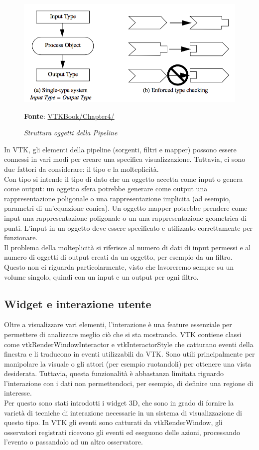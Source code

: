 \begin{figure}[h]
    \centering
    \includegraphics[scale=0.35]{immagini/volumerendering/pipeline.png}
    \caption{\textit{Struttura oggetti della Pipeline}}
    \textbf{Fonte}: \href{https://lorensen.github.io/VTKExamples/site/VTKBook/04Chapter4/}{VTKBook/Chapter4/}
    \label{fig: Struttura Pipeline}
\end{figure}

In VTK, gli elementi della pipeline (sorgenti, filtri e mapper) possono essere connessi in vari modi per creare una specifica visualizzazione. Tuttavia, ci sono due fattori da considerare: il tipo e la molteplicità.\\
Con tipo si intende il tipo di dato che un oggetto accetta come input o genera come output: un oggetto sfera potrebbe generare come output una rappresentazione poligonale o una rappresentazione implicita (ad esempio, parametri di un'equazione conica). Un oggetto mapper potrebbe prendere come input una rappresentazione poligonale o un una rappresentazione geometrica di punti. L'input in un oggetto deve essere specificato e utilizzato correttamente per funzionare.
\\
Il problema della molteplicità si riferisce al numero di dati di input permessi e al numero di oggetti di output creati da un oggetto, per esempio da un filtro. Questo non ci riguarda particolarmente, visto che lavoreremo sempre su un volume singolo, quindi con un input e un output per ogni filtro.

\subsection{Widget e interazione utente}\label{sec:widget-interazione}
Oltre a visualizzare vari elementi, l'interazione è una feature essenziale per permettere di analizzare meglio ciò che si sta mostrando. VTK contiene classi come vtkRenderWindowInteractor e vtkInteractorStyle che catturano eventi della finestra e li traducono in eventi utilizzabili da VTK. Sono utili principalmente per manipolare la visuale o gli attori (per esempio ruotandoli) per ottenere una vista desiderata. Tuttavia, questa funzionalità è abbastanza limitata riguardo l'interazione con i dati non permettendoci, per esempio, di definire una regione di interesse.\\
Per questo sono stati introdotti i widget 3D, che sono in grado di fornire la varietà di tecniche di interazione necessarie in un sistema di visualizzazione di questo tipo. In VTK gli eventi sono catturati da vtkRenderWindow, gli osservatori registrati ricevono gli eventi ed eseguono delle azioni, processando l'evento o passandolo ad un altro osservatore.

